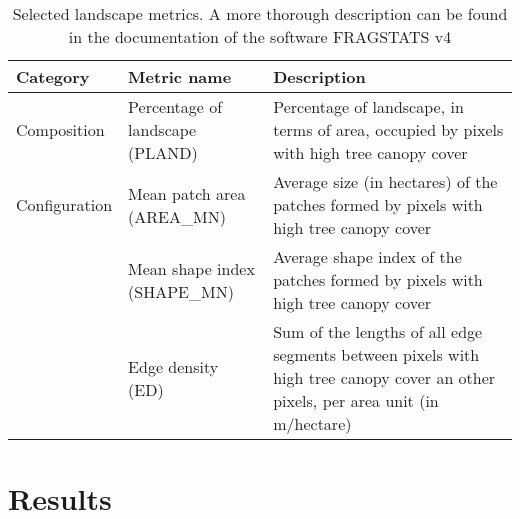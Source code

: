 \documentclass[10pt,letterpaper]{article}
\begin{document}
\begin{table}[!h]
  \footnotesize %
  \renewcommand{\arraystretch}{1.5} %
  \centering
  \begin{tabular}{p{} p{} p{}} 
    \toprule
    \textbf{Category} & \textbf{Metric name} & \textbf{Description} \\
    \midrule
    Composition & Percentage of landscape (PLAND) & Percentage of landscape, in terms of area, occupied by pixels with high tree canopy cover \\
    Configuration & Mean patch area (AREA\_MN) & Average size (in hectares) of the patches formed by pixels with high tree canopy cover \\
    & Mean shape index (SHAPE\_MN) & Average shape index of the patches formed by pixels with high tree canopy cover \\
    & Edge density (ED) & Sum of the lengths of all edge segments between pixels with high tree canopy cover an other pixels, per area unit (in m/hectare) \\    
    \bottomrule  
  \end{tabular}
  \caption{\label{tab:selected-metrics}Selected landscape metrics. A more thorough description can be found in the documentation of the software FRAGSTATS v4 \cite{mcgarigal2012fragstats}}
\end{table}


\section*{Results}


\end{document}
